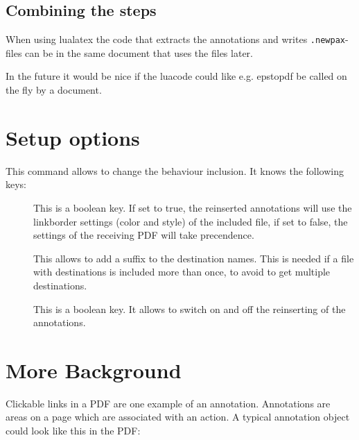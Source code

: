 \documentclass[DIV=12,parskip=half-,bibliography=totoc]{scrartcl}
\begin{document}


\subsection{Combining the steps}

When using lualatex the code that extracts the annotations and writes \texttt{.newpax}-files can be in the same document that uses the files later.

In the future it would be nice if the luacode could like e.g. epstopdf be called on the fly by a document.


\section{Setup options}

\DescribeMacro{}

This command allows to change the behaviour inclusion. It knows the following keys:

\begin{description}
  \item[] This is a boolean key. If set to true, the reinserted annotations will use the linkborder settings (color and style) of the included file, if set to false, the settings of the receiving PDF will take precendence.
      
  \item[] This allows to add a suffix to the destination names. This is needed if a file with destinations 
  is included more than once, to avoid to get multiple destinations.
      
 \item[] This is a boolean key. It allows to switch on and off the reinserting of the annotations.
      
\end{description}


\section{More Background}

Clickable links in a PDF are one example of an annotation. Annotations are areas on a page which are associated with an action. A typical annotation object could look like this in the PDF:
\end{document}
